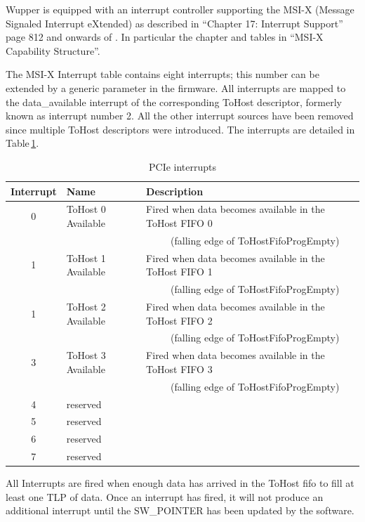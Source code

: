 Wupper is equipped with an interrupt controller supporting the MSI-X (Message Signaled Interrupt eXtended) as described in ``Chapter 17: Interrupt Support'' page 812 and onwards of \cite{PCIe_technology}. In particular the chapter and tables in ``MSI-X Capability Structure''.

The MSI-X Interrupt table contains eight interrupts; this number can be extended by a generic parameter in the firmware. All interrupts are mapped to the data\_available interrupt of the corresponding ToHost descriptor, formerly known as interrupt number 2. All the other interrupt sources have been removed since multiple ToHost descriptors were introduced.
The interrupts are detailed in Table\,\ref{tab:dma_interrupts}.


\begin{table}[htbp]
	\centering
	\caption{PCIe interrupts}
	\begin{tabular}{cll}
		\toprule
		\textbf{Interrupt} & \textbf{Name} & \textbf{Description} \\
		\midrule
		
		0     &  ToHost 0 Available      &  Fired when data becomes available in the ToHost FIFO 0  \\
		&                        & ~~~~~(falling edge of ToHostFifoProgEmpty)  \\
		1     &  ToHost 1 Available      &  Fired when data becomes available in the ToHost FIFO 1 \\
		&                        & ~~~~~(falling edge of ToHostFifoProgEmpty)  \\
		1     &  ToHost 2 Available      &  Fired when data becomes available in the ToHost FIFO 2 \\
		&                        & ~~~~~(falling edge of ToHostFifoProgEmpty)  \\
		3     &  ToHost 3 Available      &  Fired when data becomes available in the ToHost FIFO 3 \\
		&                        & ~~~~~(falling edge of ToHostFifoProgEmpty)  \\
		4     &  reserved &   \\
		5     &  reserved &   \\
		6     &  reserved &   \\
		7     &  reserved &   \\
		\bottomrule
	\end{tabular}%
	\label{tab:dma_interrupts}%
\end{table}%


All Interrupts are fired when enough data has arrived in the ToHost fifo to fill at least one TLP of data. Once an interrupt has fired, it will not produce an additional interrupt until the SW\_POINTER has been updated by the software. 

